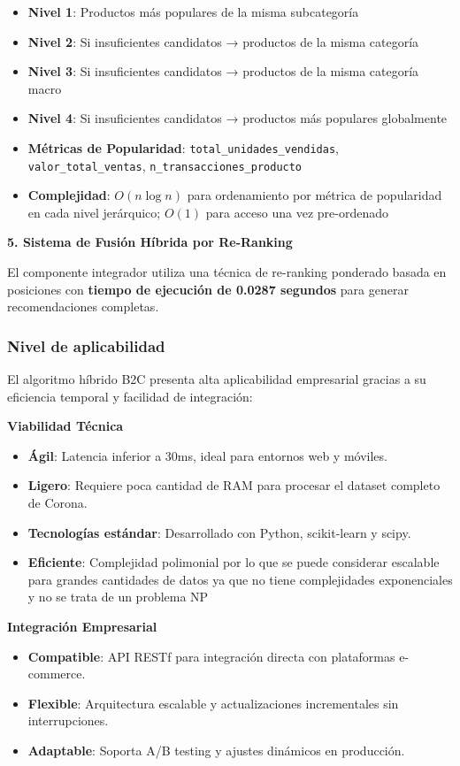 \documentclass[twocolumn]{article}
\begin{document}
\begin{itemize}
    \item \textbf{Nivel 1}: Productos más populares de la misma subcategoría
    \item \textbf{Nivel 2}: Si insuficientes candidatos → productos de la misma categoría
    \item \textbf{Nivel 3}: Si insuficientes candidatos → productos de la misma categoría macro
    \item \textbf{Nivel 4}: Si insuficientes candidatos → productos más populares globalmente
    \item \textbf{Métricas de Popularidad}: \texttt{total\_unidades\_vendidas}, \texttt{valor\_total\_ventas}, \texttt{n\_transacciones\_producto}
    \item \textbf{Complejidad}: \(O(n \log n)\) para ordenamiento por métrica de popularidad en cada nivel jerárquico; \(O(1)\) para acceso una vez pre-ordenado
\end{itemize}

\textbf{5. Sistema de Fusión Híbrida por Re-Ranking}

El componente integrador utiliza una técnica de re-ranking ponderado basada en posiciones con \textbf{tiempo de ejecución de 0.0287 segundos} para generar recomendaciones completas.

\subsubsection{Nivel de aplicabilidad}

El algoritmo híbrido B2C presenta alta aplicabilidad empresarial gracias a su eficiencia temporal y facilidad de integración:

\textbf{Viabilidad Técnica}
\begin{itemize}
\item \textbf{Ágil}: Latencia inferior a 30ms, ideal para entornos web y móviles.
\item \textbf{Ligero}: Requiere poca cantidad de RAM para procesar el dataset completo de Corona.
\item \textbf{Tecnologías estándar}: Desarrollado con Python, scikit-learn y scipy.
\item \textbf{Eficiente}: Complejidad 
polimonial por lo que se puede considerar escalable para grandes cantidades de datos ya que no tiene complejidades exponenciales y no se trata de un problema NP
\end{itemize}

\textbf{Integración Empresarial}
\begin{itemize}
\item \textbf{Compatible}: API RESTf para integración directa con plataformas e-commerce.
\item \textbf{Flexible}: Arquitectura escalable y actualizaciones incrementales sin interrupciones.
\item \textbf{Adaptable}: Soporta A/B testing y ajustes dinámicos en producción.
\end{itemize}
\end{document}

